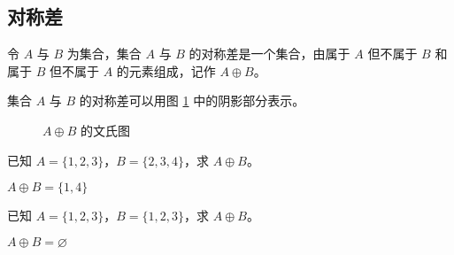 \subsection{对称差}
\begin{definition}[集合的对称差]\label{def:对称差}
    令 $A$ 与 $B$ 为集合，集合 $A$ 与 $B$ 的对称差是一个集合，由属于 $A$ 但不属于 $B$ 和属于 $B$ 但不属于 $A$ 的元素组成，记作 $A \oplus B$。
\end{definition}

集合 $A$ 与 $B$ 的对称差可以用图 \ref{fig:对称差文氏图} 中的阴影部分表示。
\begin{figure}[htbp!]
    \centering
    \caption{$A \oplus B$ 的文氏图}
    \label{fig:对称差文氏图}
\end{figure}

\begin{collections}
    \begin{example}
        已知 $A=\{1, 2, 3\}$，$B = \{2, 3, 4\}$，求 $A \oplus B$。
    \end{example}
    \begin{solution}
        $A \oplus B = \{1, 4\}$
    \end{solution}

    \spare

    \begin{example}
        已知 $A=\{1, 2, 3\}$，$B=\{1, 2, 3\}$，求 $A \oplus B$。
    \end{example}
    \begin{solution}
        $A \oplus B = \varnothing$
    \end{solution}
\end{collections}
